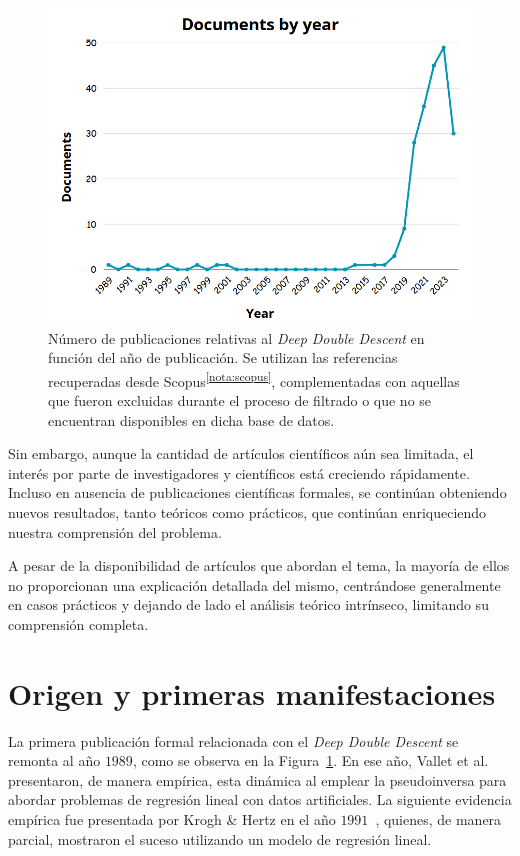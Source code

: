 \begin{figure}[h]
    \centering
    \includegraphics[width=0.7\linewidth]{img/scopus_histogram.png}
    \caption[Número de publicaciones relativas al \textit{Deep Double Descent} en función del año de publicación.] {Número de publicaciones relativas al \textit{Deep Double Descent} en función del año de publicación. Se utilizan las referencias recuperadas desde Scopus\textsuperscript{\ref{nota:scopus}}, complementadas con aquellas que fueron excluidas durante el proceso de filtrado o que no se encuentran disponibles en dicha base de datos.}\label{fig:histogram}
\end{figure}

Sin embargo, aunque la cantidad de artículos científicos aún sea limitada, el interés por parte de investigadores y científicos está creciendo rápidamente. Incluso en ausencia de publicaciones científicas formales, se continúan obteniendo nuevos resultados, tanto teóricos como prácticos, que continúan enriqueciendo nuestra comprensión del problema.\newline

A pesar de la disponibilidad de artículos que abordan el tema, la mayoría de ellos no proporcionan una explicación detallada del mismo, centrándose generalmente en casos prácticos y dejando de lado el análisis teórico intrínseco, limitando su comprensión completa.\newline

\section{Origen y primeras manifestaciones}\label{}

La primera publicación formal relacionada con el \textit{Deep Double Descent} se remonta al año $1989$, como se observa en la Figura~\ref{fig:histogram}. En ese año, Vallet et al.~\cite{Vallet1989} presentaron, de manera empírica, esta dinámica al emplear la pseudoinversa para abordar problemas de regresión lineal con datos artificiales. La siguiente evidencia empírica fue presentada por Krogh \& Hertz en el año $1991$~\cite{Krogh1991}, quienes, de manera parcial, mostraron el suceso utilizando un modelo de regresión lineal.\newline

